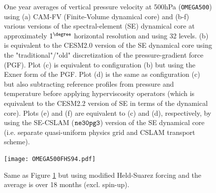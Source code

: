 \documentclass[draft]{agujournal2019}
\begin{document}
\begin{figure}[t]
\caption{One year averages of vertical pressure velocity at 500hPa ({\tt OMEGA500}) using (a) CAM-FV (Finite-Volume dynamical core) and (b-f) various versions of the spectral-element (SE) dynamical core at approximately $1^\degree$ horizontal resolution and using 32 levels. (b) is equivalent to the CESM2.0 version of the SE dynamical core using the "traditional"/"old" discretization of the pressure-gradient force (PGF). Plot (c) is equivalent to configuration (b) but using the Exner form of the PGF. Plot (d) is the same as configuration (c) but also subtracting reference profiles from pressure and temperature before applying hyperviscosity operators (which is equivalent to the CESM2.2 version of SE in terms of the dynamical core). Plots (e) and (f) are equivalent to (c) and (d), respectively, by using the SE-CSLAM ($\tt ne30pg3$) version of the SE dynamical core (i.e. separate quasi-uniform physics grid and CSLAM transport scheme).}\label{fig:OMEGA500}
\end{figure}
\begin{figure}[t]
\begin{center}
\texttt{[image: OMEGA500FHS94.pdf]}
\end{center}
\caption{Same as Figure \ref{fig:OMEGA500} but using modified Held-Suarez forcing and the average is over 18 months (excl. spin-up).}\label{fig:OMEGA500FHS94}
\end{figure}

%
%

%

%
\end{document}
